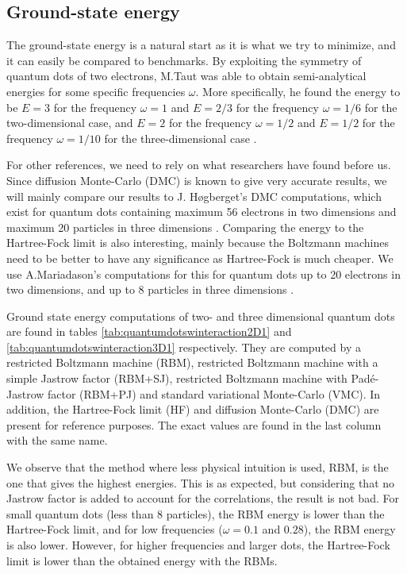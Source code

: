 \subsection{Ground-state energy} \label{sec:groundstateenergy}
The ground-state energy is a natural start as it is what we try to minimize, and it can easily be compared to benchmarks. By exploiting the symmetry of quantum dots of two electrons, M.Taut was able to obtain semi-analytical energies for some specific frequencies $\omega$. More specifically, he found the energy to be $E=3$ for the frequency $\omega=1$ and $E=2/3$ for the frequency $\omega=1/6$ for the two-dimensional case, and $E=2$ for the frequency $\omega=1/2$ and $E=1/2$ for the frequency $\omega=1/10$ for the three-dimensional case \cite{taut_two_1993,taut_two_1994}.

For other references, we need to rely on what researchers have found before us. Since diffusion Monte-Carlo (DMC) is known to give very accurate results, we will mainly compare our results to J. Høgberget's DMC computations, which exist for quantum dots containing maximum 56 electrons in two dimensions and maximum 20 particles in three dimensions \cite{hogberget_quantum_2013}. Comparing the energy to the Hartree-Fock limit is also interesting, mainly because the Boltzmann machines need to be better to have any significance as Hartree-Fock is much cheaper. We use A.Mariadason's computations for this for quantum dots up to 20 electrons in two dimensions, and up to 8 particles in three dimensions \cite{mariadason_quantum_2018}.

Ground state energy computations of two- and three dimensional quantum dots are found in tables \eqref{tab:quantumdotswinteraction2D1} and \eqref{tab:quantumdotswinteraction3D1} respectively. They are computed by a restricted Boltzmann machine (RBM), restricted Boltzmann machine with a simple Jastrow factor (RBM+SJ), restricted Boltzmann machine with Padé-Jastrow factor (RBM+PJ) and standard variational Monte-Carlo (VMC). In addition, the Hartree-Fock limit (HF) and diffusion Monte-Carlo (DMC) are present for reference purposes. The exact values are found in the last column with the same name. 

We observe that the method where less physical intuition is used, RBM, is the one that gives the highest energies. This is as expected, but considering that no Jastrow factor is added to account for the correlations, the result is not bad. For small quantum dots (less than 8 particles), the RBM energy is lower than the Hartree-Fock limit, and for low frequencies ($\omega=0.1$ and $0.28$), the RBM energy is also lower. However, for higher frequencies and larger dots, the Hartree-Fock limit is lower than the obtained energy with the RBMs.


